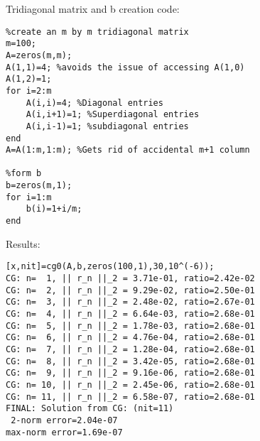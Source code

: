 \documentclass[12pt]{article}
\numberwithin{equation}{section}
\begin{document}
\begin{enumerate}
Tridiagonal matrix and b creation code:

\begin{lstlisting}
%create an m by m tridiagonal matrix
m=100;
A=zeros(m,m);
A(1,1)=4; %avoids the issue of accessing A(1,0)
A(1,2)=1;
for i=2:m
    A(i,i)=4; %Diagonal entries
    A(i,i+1)=1; %Superdiagonal entries
    A(i,i-1)=1; %subdiagonal entries
end
A=A(1:m,1:m); %Gets rid of accidental m+1 column

%form b
b=zeros(m,1);
for i=1:m
    b(i)=1+i/m;
end
\end{lstlisting}

Results:

\begin{lstlisting}
[x,nit]=cg0(A,b,zeros(100,1),30,10^(-6));
CG: n=  1, || r_n ||_2 = 3.71e-01, ratio=2.42e-02
CG: n=  2, || r_n ||_2 = 9.29e-02, ratio=2.50e-01
CG: n=  3, || r_n ||_2 = 2.48e-02, ratio=2.67e-01
CG: n=  4, || r_n ||_2 = 6.64e-03, ratio=2.68e-01
CG: n=  5, || r_n ||_2 = 1.78e-03, ratio=2.68e-01
CG: n=  6, || r_n ||_2 = 4.76e-04, ratio=2.68e-01
CG: n=  7, || r_n ||_2 = 1.28e-04, ratio=2.68e-01
CG: n=  8, || r_n ||_2 = 3.42e-05, ratio=2.68e-01
CG: n=  9, || r_n ||_2 = 9.16e-06, ratio=2.68e-01
CG: n= 10, || r_n ||_2 = 2.45e-06, ratio=2.68e-01
CG: n= 11, || r_n ||_2 = 6.58e-07, ratio=2.68e-01
FINAL: Solution from CG: (nit=11)
 2-norm error=2.04e-07
max-norm error=1.69e-07
\end{lstlisting}

\end{enumerate}
\end{document}
